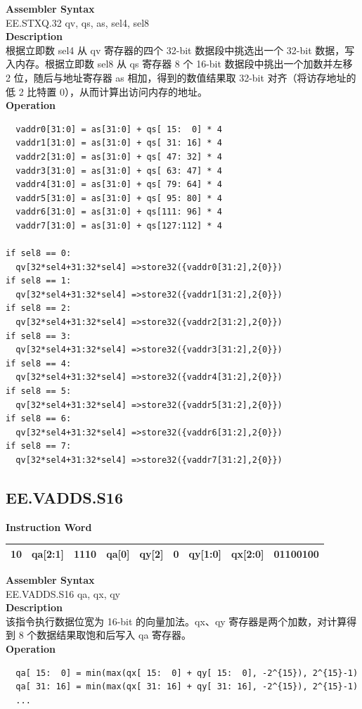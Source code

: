 \textbf{Assembler Syntax} \\
EE.STXQ.32 qv, qs, as, sel4, sel8 \\
\textbf{Description} \\
根据立即数 sel4 从 qv 寄存器的四个 32-bit 数据段中挑选出一个 32-bit 数据，写入内存。根据立即数 sel8 从 qs 寄存器 8 个 16-bit 数据段中挑出一个加数并左移 2 位，随后与地址寄存器 as 相加，得到的数值结果取 32-bit 对齐（将访存地址的低 2 比特置 0），从而计算出访问内存的地址。\\
\textbf{Operation}
\begin{lstlisting}
  vaddr0[31:0] = as[31:0] + qs[ 15:  0] * 4
  vaddr1[31:0] = as[31:0] + qs[ 31: 16] * 4
  vaddr2[31:0] = as[31:0] + qs[ 47: 32] * 4
  vaddr3[31:0] = as[31:0] + qs[ 63: 47] * 4
  vaddr4[31:0] = as[31:0] + qs[ 79: 64] * 4
  vaddr5[31:0] = as[31:0] + qs[ 95: 80] * 4
  vaddr6[31:0] = as[31:0] + qs[111: 96] * 4
  vaddr7[31:0] = as[31:0] + qs[127:112] * 4

if sel8 == 0:
  qv[32*sel4+31:32*sel4] =>store32({vaddr0[31:2],2{0}})
if sel8 == 1:
  qv[32*sel4+31:32*sel4] =>store32({vaddr1[31:2],2{0}})
if sel8 == 2:
  qv[32*sel4+31:32*sel4] =>store32({vaddr2[31:2],2{0}})
if sel8 == 3:
  qv[32*sel4+31:32*sel4] =>store32({vaddr3[31:2],2{0}})
if sel8 == 4:
  qv[32*sel4+31:32*sel4] =>store32({vaddr4[31:2],2{0}})
if sel8 == 5:
  qv[32*sel4+31:32*sel4] =>store32({vaddr5[31:2],2{0}})
if sel8 == 6:
  qv[32*sel4+31:32*sel4] =>store32({vaddr6[31:2],2{0}})
if sel8 == 7:
  qv[32*sel4+31:32*sel4] =>store32({vaddr7[31:2],2{0}})
\end{lstlisting}

\clearpage
\subsection{EE.VADDS.S16}\label{instruction:EEVADDSS16}
\setlength\tabcolsep{6pt}
\textbf{Instruction Word} \\
\begin{tabular}{|c|c|c|c|c|c|c|c|c|}
	\hline
	10 & qa[2:1] & 1110 & qa[0] & qy[2] & 0 & qy[1:0] & qx[2:0] & 01100100 \\
	\hline
\end{tabular}

\textbf{Assembler Syntax} \\
EE.VADDS.S16 qa, qx, qy \\
\textbf{Description} \\
该指令执行数据位宽为 16-bit 的向量加法。qx、qy 寄存器是两个加数，对计算得到 8 个数据结果取饱和后写入 qa 寄存器。\\
\textbf{Operation}
\begin{lstlisting}
  qa[ 15:  0] = min(max(qx[ 15:  0] + qy[ 15:  0], -2^{15}), 2^{15}-1)
  qa[ 31: 16] = min(max(qx[ 31: 16] + qy[ 31: 16], -2^{15}), 2^{15}-1)
  ...
\end{lstlisting}

